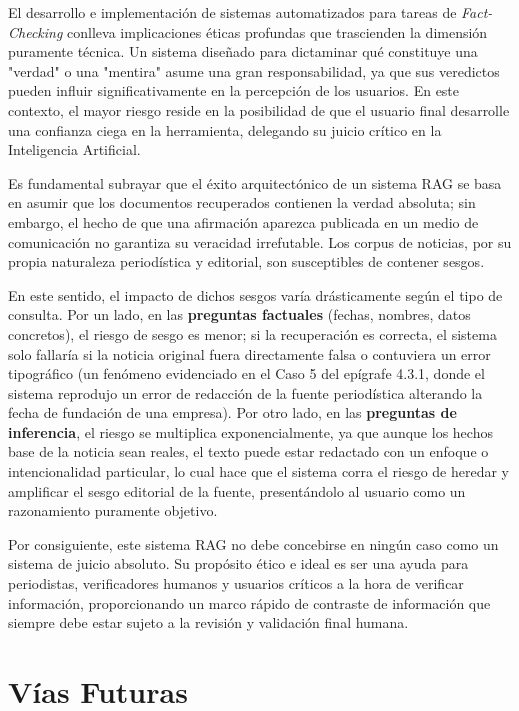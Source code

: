 El desarrollo e implementación de sistemas automatizados para tareas de \textit{Fact-Checking} conlleva implicaciones éticas profundas que trascienden la dimensión puramente técnica. Un sistema diseñado para dictaminar qué constituye una "verdad" o una "mentira" asume una gran responsabilidad, ya que sus veredictos pueden influir significativamente en la percepción de los usuarios. En este contexto, el mayor riesgo reside en la posibilidad de que el usuario final desarrolle una confianza ciega en la herramienta, delegando su juicio crítico en la Inteligencia Artificial.

Es fundamental subrayar que el éxito arquitectónico de un sistema RAG se basa en asumir que los documentos recuperados contienen la verdad absoluta; sin embargo, el hecho de que una afirmación aparezca publicada en un medio de comunicación no garantiza su veracidad irrefutable. Los corpus de noticias, por su propia naturaleza periodística y editorial, son susceptibles de contener sesgos. 

En este sentido, el impacto de dichos sesgos varía drásticamente según el tipo de consulta. Por un lado, en las \textbf{preguntas factuales} (fechas, nombres, datos concretos), el riesgo de sesgo es menor; si la recuperación es correcta, el sistema solo fallaría si la noticia original fuera directamente falsa o contuviera un error tipográfico (un fenómeno evidenciado en el Caso 5 del epígrafe 4.3.1, donde el sistema reprodujo un error de redacción de la fuente periodística alterando la fecha de fundación de una empresa). Por otro lado, en las \textbf{preguntas de inferencia}, el riesgo se multiplica exponencialmente, ya que aunque los hechos base de la noticia sean reales, el texto puede estar redactado con un enfoque o intencionalidad particular, lo cual hace que el sistema corra el riesgo de heredar y amplificar el sesgo editorial de la fuente, presentándolo al usuario como un razonamiento puramente objetivo.

Por consiguiente, este sistema RAG no debe concebirse en ningún caso como un sistema de juicio absoluto. Su propósito ético e ideal es ser una ayuda para periodistas, verificadores humanos y usuarios críticos a la hora de verificar información, proporcionando un marco rápido de contraste de información que siempre debe estar sujeto a la revisión y validación final humana.

\section{Vías Futuras}

